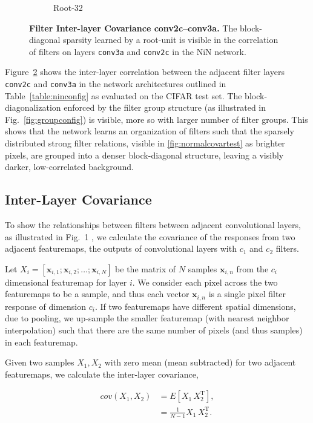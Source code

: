 \documentclass[thesis]{subfiles}
\begin{document}
{\begin{landscape}
\begin{figure}[p]
\begin{subfigure}[b]{0.32\linewidth}
				\caption{Root-32}
				\label{fig:root32corrfull}
			\end{subfigure}
			\caption{\textbf{Filter Inter-layer Covariance conv2c--conv3a.} The block-diagonal sparsity learned by a root-unit is visible in the correlation of filters on layers \texttt{conv3a} and \texttt{conv2c} in the NiN network.}
			\label{fig:covar}
		\end{figure}
	\end{landscape}}
	
	Figure~\ref{fig:covar} shows the inter-layer correlation between the adjacent filter layers \texttt{conv2c} and \texttt{conv3a} in the network architectures outlined in Table~\ref{table:ninconfig} as evaluated on the CIFAR test set. The block-diagonalization enforced by the filter group structure (as illustrated in Fig.~\ref{fig:groupconfig}) is visible, more so with larger number of filter groups. This shows that the network learns an organization of filters such that the sparsely distributed strong filter relations, visible in \ref{fig:normalcovartest} as brighter pixels, are grouped into a denser block-diagonal structure, leaving a visibly darker, low-correlated background.
	
	\subsection{Inter-Layer Covariance}
	\label{interlayercovar}
	To show the relationships between filters between adjacent convolutional layers, as illustrated in Fig.~1
	, we calculate the covariance of the responses from two adjacent featuremaps, the outputs of convolutional layers with $c_1$ and $c_2$ filters.
	
	Let $X_i = [\mathbf{x}_{i,1}; \mathbf{x}_{i,2}; \ldots ; \mathbf{x}_{i,N}]$ be the matrix of $N$ samples $\mathbf{x}_{i,n}$ from the $c_i$ dimensional featuremap for layer $i$. We consider each pixel across the two featuremaps to be a sample, and thus each vector $\mathbf{x}_{i,n}$ is a single pixel filter response of dimension $c_i$. If two featuremaps have different spatial dimensions, due to pooling, we up-sample the smaller featuremap (with nearest neighbor interpolation) such that there are the same number of pixels (and thus samples) in each featuremap.
	
	Given two samples $X_1, X_2$ with zero mean (\ie mean subtracted) for two adjacent featuremaps, we calculate the inter-layer covariance,
	
	\begin{align}
	cov(X_1, X_2) &= E\left[X_1\,X_2^\textrm{T}\right],\\
	&= \frac{1}{N-1} X_1\,X_2^\textrm{T}.
	\end{align}
	
\end{document}
